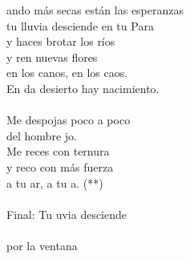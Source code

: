 \begin{cancion}%
	ando más secas están las esperanzas\\
	tu lluvia desciende en tu Para\\
	y haces brotar los ríos\\
	y ren nuevas flores\\
	en los canos, en los caos.\\
	En da desierto hay nacimiento.\\
	\jump\\
Me despojas poco a poco \\
	del hombre jo.\\
	Me reces con ternura\\
	y reco con más fuerza\\
	a tu ar, a tu a. (**)\\
	\jump\\
	Final: Tu uvia desciende \\
	\jump\\
       por la ventana\\
\end{cancion}%
